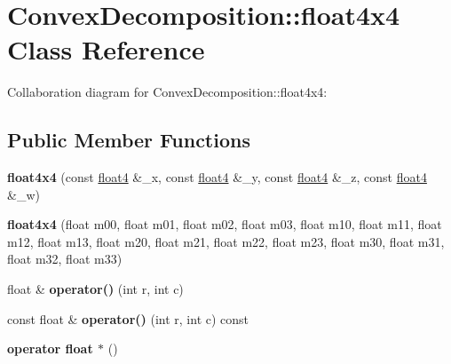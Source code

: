 \hypertarget{class_convex_decomposition_1_1float4x4}{\section{Convex\+Decomposition\+:\+:float4x4 Class Reference}
\label{class_convex_decomposition_1_1float4x4}
}


Collaboration diagram for Convex\+Decomposition\+:\+:float4x4\+:
\subsection*{Public Member Functions}
\begin{DoxyCompactItemize}
\item 
\hypertarget{class_convex_decomposition_1_1float4x4_a30ef46eaa09f2f3c83492660aaae3c8c}{{\bfseries float4x4} (const \hyperlink{class_convex_decomposition_1_1float4}{float4} \&\+\_\+x, const \hyperlink{class_convex_decomposition_1_1float4}{float4} \&\+\_\+y, const \hyperlink{class_convex_decomposition_1_1float4}{float4} \&\+\_\+z, const \hyperlink{class_convex_decomposition_1_1float4}{float4} \&\+\_\+w)}\label{class_convex_decomposition_1_1float4x4_a30ef46eaa09f2f3c83492660aaae3c8c}

\item 
\hypertarget{class_convex_decomposition_1_1float4x4_a113556659f2eb1e2cf39cf8a275461c3}{{\bfseries float4x4} (float m00, float m01, float m02, float m03, float m10, float m11, float m12, float m13, float m20, float m21, float m22, float m23, float m30, float m31, float m32, float m33)}\label{class_convex_decomposition_1_1float4x4_a113556659f2eb1e2cf39cf8a275461c3}

\item 
\hypertarget{class_convex_decomposition_1_1float4x4_a160b3d2afaf0e10707198f645ec25202}{float \& {\bfseries operator()} (int r, int c)}\label{class_convex_decomposition_1_1float4x4_a160b3d2afaf0e10707198f645ec25202}

\item 
\hypertarget{class_convex_decomposition_1_1float4x4_a916c6bbffd2fd9d6ed4a6667bcb0f4af}{const float \& {\bfseries operator()} (int r, int c) const }\label{class_convex_decomposition_1_1float4x4_a916c6bbffd2fd9d6ed4a6667bcb0f4af}

\item 
\hypertarget{class_convex_decomposition_1_1float4x4_a034d4d9803b6b768c0b163b41a595b45}{{\bfseries operator float $\ast$} ()}\label{class_convex_decomposition_1_1float4x4_a034d4d9803b6b768c0b163b41a595b45}


\end{DoxyCompactItemize}
